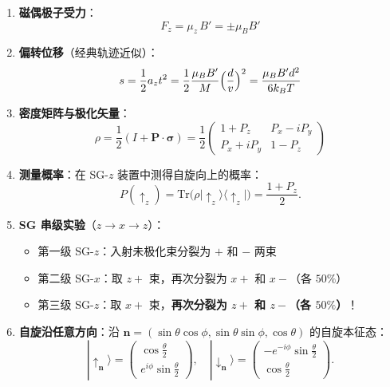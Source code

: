 \begin{formulabox}[核心公式]
\begin{enumerate}[label=\textbf{(\arabic*)}]
    \item \textbf{磁偶极子受力}：
    \[
    F_z=\mu_z\,B'=\pm\mu_B B'
    \]

    \item \textbf{偏转位移}（经典轨迹近似）：
    \[
    s=\frac12 a_z t^2=\frac12\frac{\mu_B B'}{M}\Bigl(\frac{d}{v}\Bigr)^2
    =\frac{\mu_B B' d^2}{6k_B T}
    \]

    \item \textbf{密度矩阵与极化矢量}：
    \[
    \rho=\frac12(I+\mathbf{P}\cdot\boldsymbol{\sigma})=\frac12\begin{pmatrix}1+P_z&P_x-iP_y\\P_x+iP_y&1-P_z\end{pmatrix}
    \]

    \item \textbf{测量概率}：在 SG-$z$ 装置中测得自旋向上的概率：
    \[
    P(\uparrow_z)=\text{Tr}\bigl(\rho|\uparrow_z\rangle\langle\uparrow_z|\bigr)=\frac{1+P_z}{2}.
    \]

    \item \textbf{SG 串级实验}（$z\to x\to z$）：
    \begin{itemize}[nosep]
        \item 第一级 SG-$z$：入射未极化束分裂为 $+$ 和 $-$ 两束
        \item 第二级 SG-$x$：取 $z+$ 束，再次分裂为 $x+$ 和 $x-$（各 $50\%$）
        \item 第三级 SG-$z$：取 $x+$ 束，\textbf{再次分裂为 $z+$ 和 $z-$（各 $50\%$）}！
    \end{itemize}

    \item \textbf{自旋沿任意方向}：沿 $\mathbf{n}=(\sin\theta\cos\phi,\sin\theta\sin\phi,\cos\theta)$ 的自旋本征态：
    \[
    |\uparrow_\mathbf{n}\rangle=\begin{pmatrix}\cos\frac{\theta}{2}\\e^{i\phi}\sin\frac{\theta}{2}\end{pmatrix},\quad
    |\downarrow_\mathbf{n}\rangle=\begin{pmatrix}-e^{-i\phi}\sin\frac{\theta}{2}\\\cos\frac{\theta}{2}\end{pmatrix}.
    \]
\end{enumerate}
\end{formulabox}

